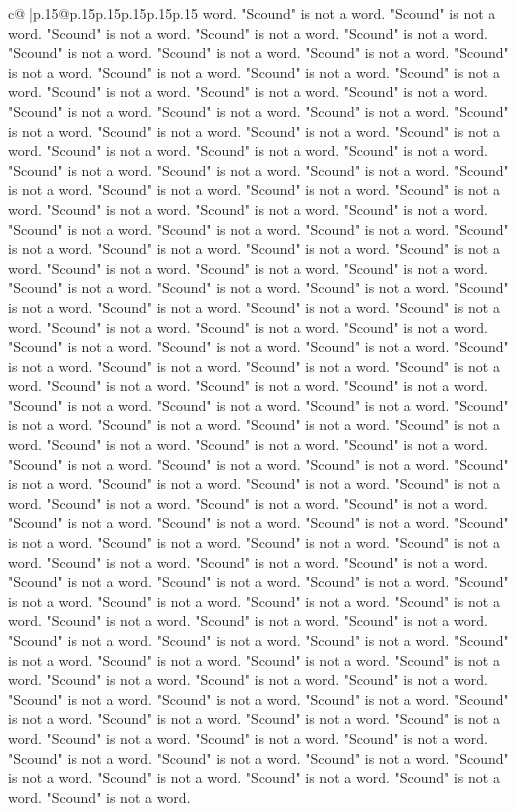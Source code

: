 \documentclass{article}
\begin{document}
{\begin{supertabular}{c@{$\;$}|p{.15\linewidth}@{}p{.15\linewidth}p{.15\linewidth}p{.15\linewidth}p{.15\linewidth}p{.15\linewidth}}
{{{word. "Scound" is not a word. "Scound" is not a word. "Scound" is not a word. "Scound" is not a word. "Scound" is not a word. "Scound" is not a word. "Scound" is not a word. "Scound" is not a word. "Scound" is not a word. "Scound" is not a word. "Scound" is not a word. "Scound" is not a word. "Scound" is not a word. "Scound" is not a word. "Scound" is not a word. "Scound" is not a word. "Scound" is not a word. "Scound" is not a word. "Scound" is not a word. "Scound" is not a word. "Scound" is not a word. "Scound" is not a word. "Scound" is not a word. "Scound" is not a word. "Scound" is not a word. "Scound" is not a word. "Scound" is not a word. "Scound" is not a word. "Scound" is not a word. "Scound" is not a word. "Scound" is not a word. "Scound" is not a word. "Scound" is not a word. "Scound" is not a word. "Scound" is not a word. "Scound" is not a word. "Scound" is not a word. "Scound" is not a word. "Scound" is not a word. "Scound" is not a word. "Scound" is not a word. "Scound" is not a word. "Scound" is not a word. "Scound" is not a word. "Scound" is not a word. "Scound" is not a word. "Scound" is not a word. "Scound" is not a word. "Scound" is not a word. "Scound" is not a word. "Scound" is not a word. "Scound" is not a word. "Scound" is not a word. "Scound" is not a word. "Scound" is not a word. "Scound" is not a word. "Scound" is not a word. "Scound" is not a word. "Scound" is not a word. "Scound" is not a word. "Scound" is not a word. "Scound" is not a word. "Scound" is not a word. "Scound" is not a word. "Scound" is not a word. "Scound" is not a word. "Scound" is not a word. "Scound" is not a word. "Scound" is not a word. "Scound" is not a word. "Scound" is not a word. "Scound" is not a word. "Scound" is not a word. "Scound" is not a word. "Scound" is not a word. "Scound" is not a word. "Scound" is not a word. "Scound" is not a word. "Scound" is not a word. "Scound" is not a word. "Scound" is not a word. "Scound" is not a word. "Scound" is not a word. "Scound" is not a word. "Scound" is not a word. "Scound" is not a word. "Scound" is not a word. "Scound" is not a word. "Scound" is not a word. "Scound" is not a word. "Scound" is not a word. "Scound" is not a word. "Scound" is not a word. "Scound" is not a word. "Scound" is not a word. "Scound" is not a word. "Scound" is not a word. "Scound" is not a word. "Scound" is not a word. "Scound" is not a word. "Scound" is not a word. "Scound" is not a word. "Scound" is not a word. "Scound" is not a word. "Scound" is not a word. "Scound" is not a word. "Scound" is not a word. "Scound" is not a word. "Scound" is not a word. "Scound" is not a word. "Scound" is not a word. "Scound" is not a word. "Scound" is not a word. "Scound" is not a word. "Scound" is not a word. "Scound" is not a word. "Scound" is not a word. "Scound" is not a word. "Scound" is not a word. "Scound" is not a word. "Scound" is not a word. "Scound" is not a word. "Scound" is not a word. "Scound" is not a word. "Scound" is not a word. "Scound" is not a word. "Scound" is not a word. "Scound" is not a word. "Scound" is not a word. "Scound" is not a word. "Scound" is not a word. "Scound" is not a word. "Scound" is not a word. }}}
\end{supertabular}}
\end{document}
